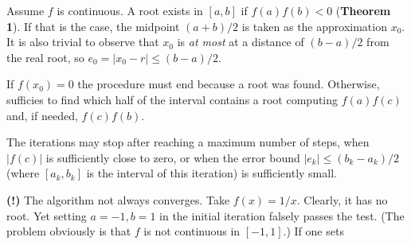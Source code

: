 \documentclass[12pt]{article}
\theoremstyle{definition}
\begin{document}
Assume $f$ is continuous. A root exists in $[a, b]$ if $f(a)f(b) < 0$
(\textbf{Theorem 1}). If that is the case, the midpoint $(a+b) / 2$ is taken as
the approximation $x_0$. It is also trivial to observe that $x_0$ is \textit{at
most} at a distance of $(b-a) / 2$ from the real root, so $e_0 = |x_0 - r| \leq
(b-a) / 2$. 

If $f(x_0) = 0$ the procedure must end because a root was found. Otherwise,
sufficies to find which half of the interval contains a root computing
$f(a)f(c)$ and, if needed, $f(c)f(b)$.

The iterations may stop after reaching a maximum number of steps, when $|f(c)|$
is sufficiently close to zero, or when the error bound $|e_k| \leq (b_k - a_k) /
2$ (where $[a_k, b_k]$ is the interval of this iteration) is sufficiently small.

\begin{shaded}
    \textbf{(!)} The algorithm not always converges. Take $f(x) = 1 / x$. Clearly, it has no
    root. Yet setting $a = -1, b=1$ in the initial iteration falsely passes the
    test. (The problem obviously is that $f$ is not continuous in $[-1, 1]$.) If
    one sets
\end{shaded}

\pagebreak 
\end{document}
